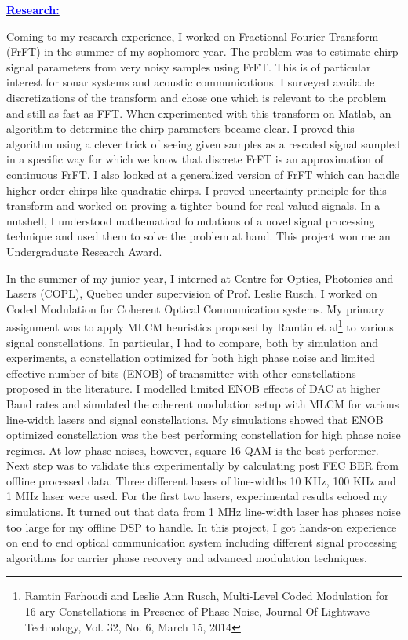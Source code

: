 \documentclass[11pt]{article}
\newcommand{\statement}[1]{\par\medskip
  \underline{\textcolor{blue}{\textbf{#1:}}}\space
}
\begin{document}
\statement{Research}
Coming to my research experience, I worked on Fractional Fourier Transform (FrFT) in the summer of my sophomore year. 
The problem was to estimate chirp signal parameters from very noisy samples using FrFT. This is of particular interest for sonar systems and acoustic communications. 
I surveyed available discretizations of the transform and chose one which is relevant to the problem and still as fast as FFT. 
When experimented with this transform on Matlab, an algorithm to determine the chirp parameters became clear. 
I proved this algorithm using a clever trick of seeing given samples as a rescaled signal sampled in a specific way for which we know that discrete FrFT is an approximation of continuous FrFT. 
I also looked at a generalized version of FrFT which can handle higher order chirps like quadratic chirps. 
I proved uncertainty principle for this transform and worked on proving a tighter bound for real valued signals. 
In a nutshell, I understood mathematical foundations of a novel signal processing technique and used them to solve the problem at hand. This project won me an Undergraduate Research Award.

In the summer of my junior year, I interned at Centre for Optics, Photonics and Lasers (COPL), Quebec under supervision of Prof. Leslie Rusch. I worked on Coded Modulation for Coherent Optical Communication systems. 
My primary assignment was to apply MLCM heuristics proposed by Ramtin et al\footnote{ Ramtin Farhoudi and Leslie Ann Rusch, Multi-Level Coded Modulation for 16-ary Constellations in Presence 
		of Phase Noise, Journal Of Lightwave Technology, Vol. 32, No. 6, March 15, 2014}
to various signal constellations. 
In particular, I had to compare, both by simulation and experiments, a constellation optimized for both high phase noise and limited effective number of bits (ENOB) of transmitter with other constellations proposed in the literature. 
I modelled limited ENOB effects of DAC at higher Baud rates and simulated the coherent modulation setup with MLCM for various line-width lasers and signal constellations.
 My simulations showed that ENOB optimized constellation was the best performing constellation for high phase noise regimes. 
At low phase noises, however, square 16 QAM is the best performer. Next step was to validate this experimentally by calculating post FEC BER from offline processed data. 
Three different lasers of line-widths 10 KHz, 100 KHz and 1 MHz laser were used. For the first two lasers, experimental results echoed my simulations. 
It turned out that data from 1 MHz line-width laser has phases noise too large for my offline DSP to handle. 
In this project, I got hands-on experience on end to end optical communication system including different signal processing algorithms for carrier phase recovery and advanced modulation techniques.
\end{document}
